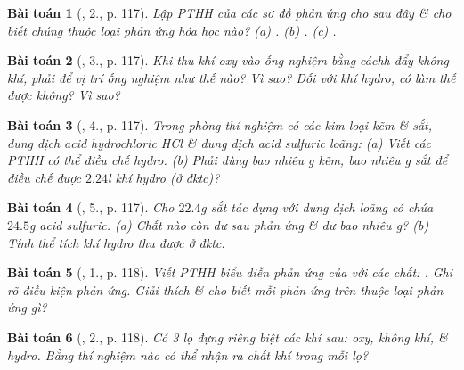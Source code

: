 \documentclass{article}
\newtheorem{baitoan}{Bài toán}
\begin{document}
\begin{baitoan}[\cite{SGK_Hoa_Hoc_8}, 2., p. 117]
	Lập PTHH của các sơ đồ phản ứng cho sau đây \& cho biết chúng thuộc loại phản ứng hóa học nào? (a) \emph{}. (b) \emph{}. (c) \emph{}.
\end{baitoan}

\begin{baitoan}[\cite{SGK_Hoa_Hoc_8}, 3., p. 117]
	Khi thu khí oxy vào ống nghiệm bằng cáchh đẩy không khí, phải để vị trí ống nghiệm như thế nào? Vì sao? Đối với khí hydro, có làm thế được không? Vì sao?
\end{baitoan}

\begin{baitoan}[\cite{SGK_Hoa_Hoc_8}, 4., p. 117]
	Trong phòng thí nghiệm có các kim loại kẽm \& sắt, dung dịch acid hydrochloric \emph{HCl} \& dung dịch acid sulfuric \emph{} loãng: (a) Viết các PTHH có thể điều chế hydro. (b) Phải dùng bao nhiêu \emph{g} kẽm, bao nhiêu \emph{g} sắt để điều chế được $2.24$\emph{l} khí hydro (ở đktc)?
\end{baitoan}

\begin{baitoan}[\cite{SGK_Hoa_Hoc_8}, 5., p. 117]
	Cho $22.4$\emph{g} sắt tác dụng với dung dịch loãng có chứa $24.5$\emph{g} acid sulfuric. (a) Chất nào còn dư sau phản ứng \& dư bao nhiêu \emph{g}? (b) Tính thể tích khí hydro thu được ở đktc.
\end{baitoan}

\begin{baitoan}[\cite{SGK_Hoa_Hoc_8}, 1., p. 118]
	Viết PTHH biểu diễn phản ứng của \emph{} với các chất: \emph{}. Ghi rõ điều kiện phản ứng. Giải thích \& cho biết mỗi phản ứng trên thuộc loại phản ứng gì?
\end{baitoan}

\begin{baitoan}[\cite{SGK_Hoa_Hoc_8}, 2., p. 118]
	Có 3 lọ đựng riêng biệt các khí sau: oxy, không khí, \& hydro. Bằng thí nghiệm nào có thể nhận ra chất khí trong mỗi lọ?	
\end{baitoan}
\end{document}
